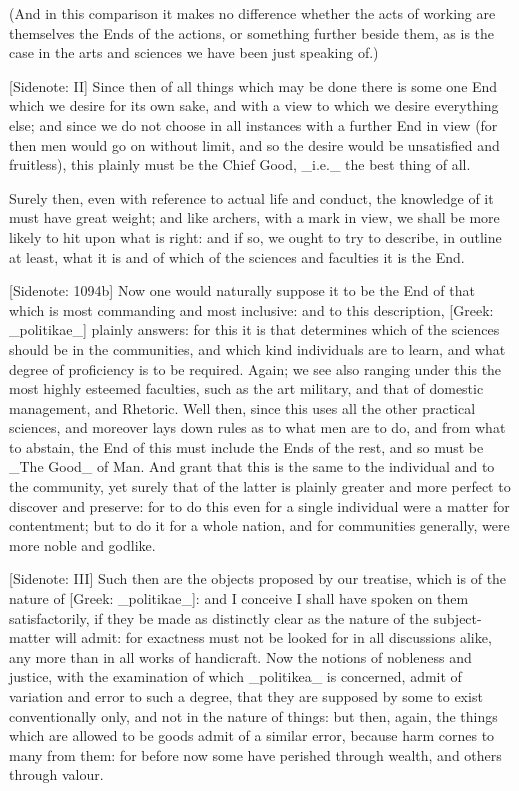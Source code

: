 (And in this comparison it makes no difference whether the acts of
working are themselves the Ends of the actions, or something further
beside them, as is the case in the arts and sciences we have been just
speaking of.)

[Sidenote: II] Since then of all things which may be done there is some
one End which we desire for its own sake, and with a view to which we
desire everything else; and since we do not choose in all instances with
a further End in view (for then men would go on without limit, and so
the desire would be unsatisfied and fruitless), this plainly must be the
Chief Good, _i.e._ the best thing of all.

Surely then, even with reference to actual life and conduct, the
knowledge of it must have great weight; and like archers, with a mark in
view, we shall be more likely to hit upon what is right: and if so, we
ought to try to describe, in outline at least, what it is and of which
of the sciences and faculties it is the End.

[Sidenote: 1094b] Now one would naturally suppose it to be the End
of that which is most commanding and most inclusive: and to this
description, [Greek: _politikae_] plainly answers: for this it is that
determines which of the sciences should be in the communities, and which
kind individuals are to learn, and what degree of proficiency is to be
required. Again; we see also ranging under this the most highly esteemed
faculties, such as the art military, and that of domestic management,
and Rhetoric. Well then, since this uses all the other practical
sciences, and moreover lays down rules as to what men are to do, and
from what to abstain, the End of this must include the Ends of the rest,
and so must be _The Good_ of Man. And grant that this is the same to
the individual and to the community, yet surely that of the latter is
plainly greater and more perfect to discover and preserve: for to do
this even for a single individual were a matter for contentment; but to
do it for a whole nation, and for communities generally, were more noble
and godlike.


[Sidenote: III] Such then are the objects proposed by our treatise,
which is of the nature of [Greek: _politikae_]: and I conceive I shall
have spoken on them satisfactorily, if they be made as distinctly clear
as the nature of the subject-matter will admit: for exactness must not
be looked for in all discussions alike, any more than in all works
of handicraft. Now the notions of nobleness and justice, with the
examination of which _politikea_ is concerned, admit of variation
and error to such a degree, that they are supposed by some to exist
conventionally only, and not in the nature of things: but then, again,
the things which are allowed to be goods admit of a similar error,
because harm cornes to many from them: for before now some have perished
through wealth, and others through valour.

